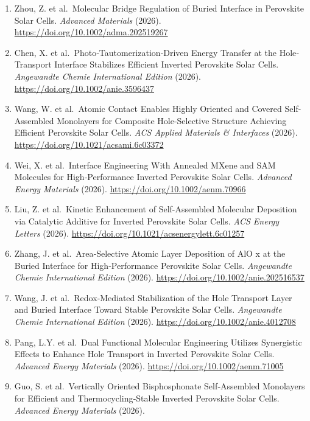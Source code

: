 \documentclass[
  11pt,
]{article}
\begin{document}
\begin{enumerate}
  Engineering for High‐Performance Perovskite Solar Cells.
  \emph{Advanced Materials} (2026).
  \url{https://doi.org/10.1002/adma.73306}
\item
  Zhou, Z. et al.~Molecular Bridge Regulation of Buried Interface in
  Perovskite Solar Cells. \emph{Advanced Materials} (2026).
  \url{https://doi.org/10.1002/adma.202519267}
\item
  Chen, X. et al.~Photo‐Tautomerization‐Driven Energy Transfer at the
  Hole‐Transport Interface Stabilizes Efficient Inverted Perovskite
  Solar Cells. \emph{Angewandte Chemie International Edition} (2026).
  \url{https://doi.org/10.1002/anie.3596437}
\item
  Wang, W. et al.~Atomic Contact Enables Highly Oriented and Covered
  Self-Assembled Monolayers for Composite Hole-Selective Structure
  Achieving Efficient Perovskite Solar Cells. \emph{ACS Applied
  Materials \& Interfaces} (2026).
  \url{https://doi.org/10.1021/acsami.6c03372}
\item
  Wei, X. et al.~Interface Engineering With Annealed MXene and SAM
  Molecules for High‐Performance Inverted Perovskite Solar Cells.
  \emph{Advanced Energy Materials} (2026).
  \url{https://doi.org/10.1002/aenm.70966}
\item
  Liu, Z. et al.~Kinetic Enhancement of Self-Assembled Molecular
  Deposition via Catalytic Additive for Inverted Perovskite Solar Cells.
  \emph{ACS Energy Letters} (2026).
  \url{https://doi.org/10.1021/acsenergylett.6c01257}
\item
  Zhang, J. et al.~Area‐Selective Atomic Layer Deposition of AlO x at
  the Buried Interface for High‐Performance Perovskite Solar Cells.
  \emph{Angewandte Chemie International Edition} (2026).
  \url{https://doi.org/10.1002/anie.202516537}
\item
  Wang, J. et al.~Redox‐Mediated Stabilization of the Hole Transport
  Layer and Buried Interface Toward Stable Perovskite Solar Cells.
  \emph{Angewandte Chemie International Edition} (2026).
  \url{https://doi.org/10.1002/anie.4012708}
\item
  Pang, L.Y. et al.~Dual Functional Molecular Engineering Utilizes
  Synergistic Effects to Enhance Hole Transport in Inverted Perovskite
  Solar Cells. \emph{Advanced Energy Materials} (2026).
  \url{https://doi.org/10.1002/aenm.71005}
\item
  Guo, S. et al.~Vertically Oriented Bisphosphonate Self‐Assembled
  Monolayers for Efficient and Thermocycling‐Stable Inverted Perovskite
  Solar Cells. \emph{Advanced Energy Materials} (2026).

\end{enumerate}
\end{document}
